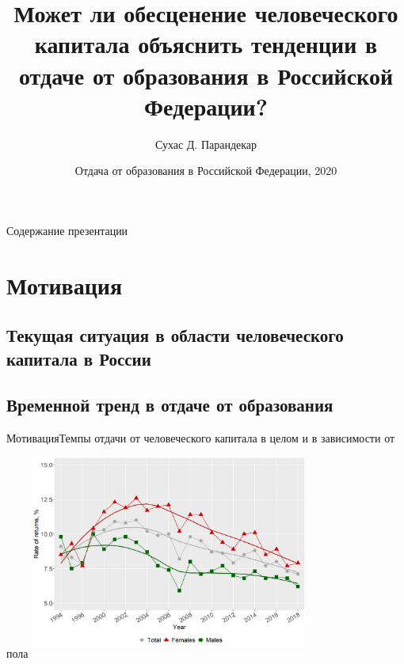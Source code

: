 \documentclass{beamer}
\title[]{Может ли обесценение человеческого капитала объяснить тенденции в отдаче от образования в Российской Федерации?}
\author{Сухас Д. Парандекар}
\date[Семинар Всемирного банка, 2020]{Отдача от образования в Российской Федерации, 2020}
\begin{document}
	
\begin{frame}
	\titlepage
\end{frame}

\begin{frame}{Содержание презентации}
	\tableofcontents
\end{frame}
	
\section{Мотивация}

\subsection{Текущая ситуация в области человеческого капитала в России}
\subsection{Временной тренд в отдаче от образования}

\begin{frame}{Мотивация}{Темпы отдачи от человеческого капитала в целом и в зависимости от пола}
	\centering
	\includegraphics[width=260pt, height=200pt]{re_edu.png}
\end{frame}
\end{document}
